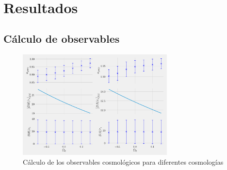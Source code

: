 \chapter{Resultados}

\section{Cálculo de observables}

\begin{figure}[b]
	\centering
	\includegraphics[width=0.7\textwidth]{../figs/DA_DH_flat.pdf}
	\caption{Cálculo de los observables cosmológicos para diferentes cosmologías}
	\label{fig:DA_DH_flat}
\end{figure}
